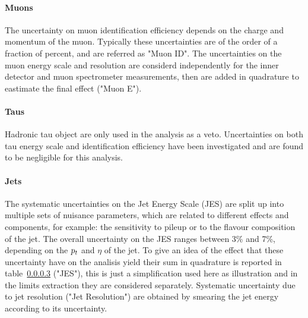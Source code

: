 \paragraph{Muons}
The uncertainty on muon identification efficiency depends on the charge and momentum of the muon.
Typically these uncertainties are of the order of a fraction of percent, and are referred as "Muon ID". 
The uncertainties on the muon energy scale and resolution are considerd independently for the inner detector 
and muon spectrometer measurements, then are added in quadrature to eastimate the final effect ("Muon E").

\paragraph{Taus}
Hadronic tau object are only used in the analysis as a veto. Uncertainties on both tau energy scale 
and identification efficiency have been investigated and are found to be negligible for this analysis.

\paragraph{Jets}
The systematic uncertainties on the Jet Energy Scale (JES) are split up into multiple sets of nuisance parameters, which
are related to different effects and components, for example: the sensitivity to pileup or
to the flavour composition of the jet. The overall uncertainty on the JES ranges 
between 3\% and 7\%, depending on the $p_{t}$ and $\eta$ of the jet. To give an idea of the effect that these
uncertainty have on the analisis yield their sum in quadrature is reported in table~\ref{} ("JES"), 
this is just a simplification used here as illustration and in the limits extraction they are considered separately.
Systematic uncertainty due to jet resolution ("Jet Resolution") are obtained by smearing the jet energy 
according to its uncertainty.

